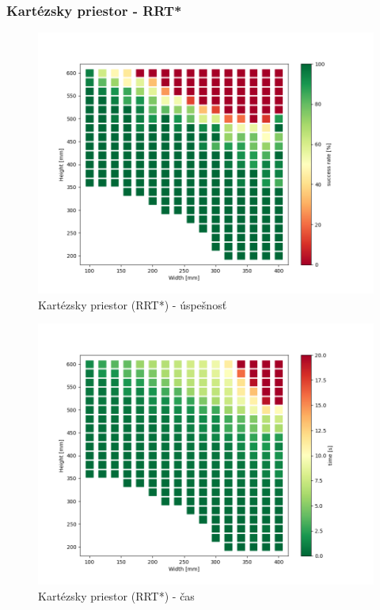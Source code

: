  


\subsubsection{Kartézsky priestor - RRT*}

\begin{figure}[h]
	\centering
	\includegraphics[width=140mm]{img/XYA-star-size.png}
	\caption{Kartézsky priestor (RRT*) - úspešnosť} \label{OBRAZOK 5.1.4} 
\end{figure} 

\begin{figure}[h]
	\centering
	\includegraphics[width=140mm]{img/XYA-star-time.png}
	\caption{Kartézsky priestor (RRT*) - čas} \label{OBRAZOK 5.1.5} 
\end{figure} 

